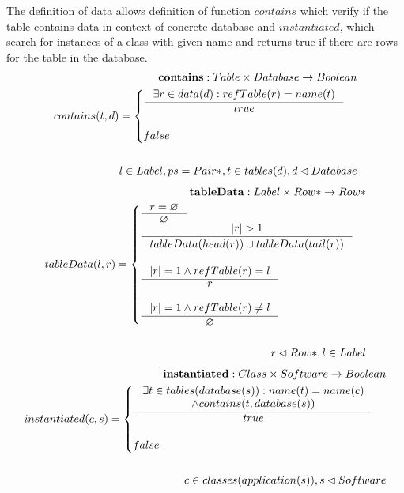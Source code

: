 \documentclass[11pt]{article}
\begin{document}
The definition of data allows definition of function $contains$ which verify if the table contains data in context of concrete database and $instantiated$, which search for instances of a class with given name and returns true if there are rows for the table in the database.
\begin{align*}
	\mathbf{contains} : Table \times Database \rightarrow Boolean \\
	contains(t, d) = \begin{cases}
			\inference{\exists r \in data(d) : refTable(r) = name(t) }{true} \\ \\
		 	false
 		\end{cases} \\ \\
 l \in Label, ps = Pair*, t \in tables(d), d \lhd Database
\end{align*}
\begin{align*}
	\mathbf{tableData} : Label \times Row* \rightarrow Row* \\
	tableData(l, r) = \begin{cases}
 		\inference{r = \varnothing}{\varnothing} \\
 		\inference{|r| > 1}{tableData(head(r)) \cup tableData(tail(r))}\\ \\
 		\inference{|r| = 1 \wedge refTable(r) = l}{r}\\\\
 		\inference{|r| = 1 \wedge refTable(r) \neq l}{\varnothing}
 \end{cases} \\ \\
	r \lhd Row*, l \in Label
\end{align*}
\begin{align*}
	\mathbf{instantiated} : Class \times Software \rightarrow Boolean \\
	instantiated(c, s) = \begin{cases} \inference{\exists t \in tables(database(s)) : name(t) = name(c) \\ \wedge contains(t, database(s))}{true} \\ \\
  false
 \end{cases} \\ \\
	 c \in classes(application(s)), s \lhd Software 
\end{align*}
\end{document}
